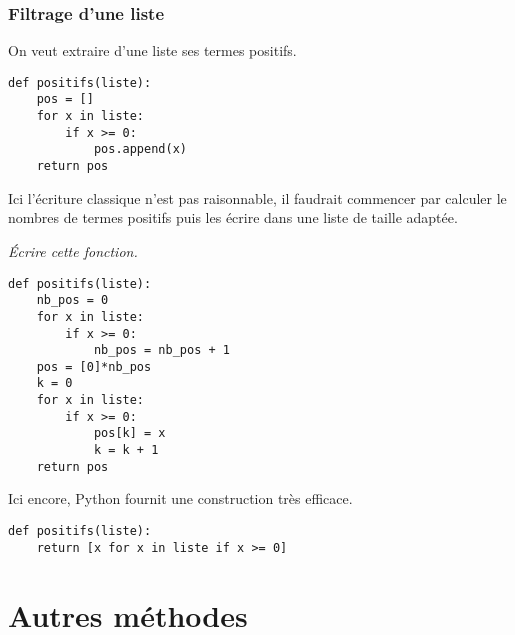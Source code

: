 \subsubsection{Filtrage d'une liste}
On veut extraire d'une liste ses termes positifs.
\begin{lstlisting}
def positifs(liste):
    pos = []
    for x in liste:
        if x >= 0:
            pos.append(x)
    return pos
\end{lstlisting}
Ici l'écriture classique n'est pas raisonnable, il faudrait commencer par calculer le nombres de termes positifs puis les écrire dans une liste de taille adaptée. 
\begin{Exercise}\it 
Écrire cette fonction.
\end{Exercise}
\begin{Answer}
\begin{lstlisting}
def positifs(liste):
    nb_pos = 0
    for x in liste:
        if x >= 0:
            nb_pos = nb_pos + 1
    pos = [0]*nb_pos
    k = 0
    for x in liste:
        if x >= 0:
            pos[k] = x
            k = k + 1
    return pos
\end{lstlisting}
\end{Answer}
Ici encore, Python fournit une construction très efficace.
\begin{lstlisting}
def positifs(liste):
    return [x for x in liste if x >= 0]
\end{lstlisting}
\section{Autres méthodes}

